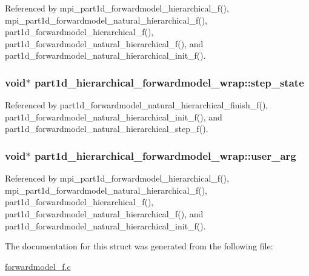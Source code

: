 Referenced by mpi\+\_\+part1d\+\_\+forwardmodel\+\_\+hierarchical\+\_\+f(), mpi\+\_\+part1d\+\_\+forwardmodel\+\_\+natural\+\_\+hierarchical\+\_\+f(), part1d\+\_\+forwardmodel\+\_\+hierarchical\+\_\+f(), part1d\+\_\+forwardmodel\+\_\+natural\+\_\+hierarchical\+\_\+f(), and part1d\+\_\+forwardmodel\+\_\+natural\+\_\+hierarchical\+\_\+init\+\_\+f().

\subsubsection[{\texorpdfstring{step\+\_\+state}{step_state}}]{\setlength{\rightskip}{0pt plus 5cm}void$\ast$ part1d\+\_\+hierarchical\+\_\+forwardmodel\+\_\+wrap\+::step\+\_\+state}\hypertarget{structpart1d__hierarchical__forwardmodel__wrap_a884b7afabf5dd3b89bd27e02e2349f4b}{}\label{structpart1d__hierarchical__forwardmodel__wrap_a884b7afabf5dd3b89bd27e02e2349f4b}


Referenced by part1d\+\_\+forwardmodel\+\_\+natural\+\_\+hierarchical\+\_\+finish\+\_\+f(), part1d\+\_\+forwardmodel\+\_\+natural\+\_\+hierarchical\+\_\+init\+\_\+f(), and part1d\+\_\+forwardmodel\+\_\+natural\+\_\+hierarchical\+\_\+step\+\_\+f().

\subsubsection[{\texorpdfstring{user\+\_\+arg}{user_arg}}]{\setlength{\rightskip}{0pt plus 5cm}void$\ast$ part1d\+\_\+hierarchical\+\_\+forwardmodel\+\_\+wrap\+::user\+\_\+arg}\hypertarget{structpart1d__hierarchical__forwardmodel__wrap_ac8850ffd6ff8d003abe793231be2069a}{}\label{structpart1d__hierarchical__forwardmodel__wrap_ac8850ffd6ff8d003abe793231be2069a}


Referenced by mpi\+\_\+part1d\+\_\+forwardmodel\+\_\+hierarchical\+\_\+f(), mpi\+\_\+part1d\+\_\+forwardmodel\+\_\+natural\+\_\+hierarchical\+\_\+f(), part1d\+\_\+forwardmodel\+\_\+hierarchical\+\_\+f(), part1d\+\_\+forwardmodel\+\_\+natural\+\_\+hierarchical\+\_\+f(), and part1d\+\_\+forwardmodel\+\_\+natural\+\_\+hierarchical\+\_\+init\+\_\+f().



The documentation for this struct was generated from the following file\+:\begin{DoxyCompactItemize}
\item 
\hyperlink{forwardmodel__f_8c}{forwardmodel\+\_\+f.\+c}\end{DoxyCompactItemize}
